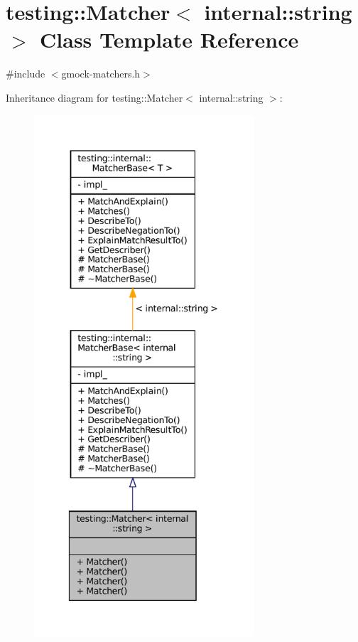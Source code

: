 \hypertarget{classtesting_1_1Matcher_3_01internal_1_1string_01_4}{}\section{testing\+:\+:Matcher$<$ internal\+:\+:string $>$ Class Template Reference}
\label{classtesting_1_1Matcher_3_01internal_1_1string_01_4}


{\ttfamily \#include $<$gmock-\/matchers.\+h$>$}



Inheritance diagram for testing\+:\+:Matcher$<$ internal\+:\+:string $>$\+:
\nopagebreak
\begin{figure}[H]
\begin{center}
\leavevmode
\includegraphics[height=550pt]{classtesting_1_1Matcher_3_01internal_1_1string_01_4__inherit__graph}
\end{center}
\end{figure}


